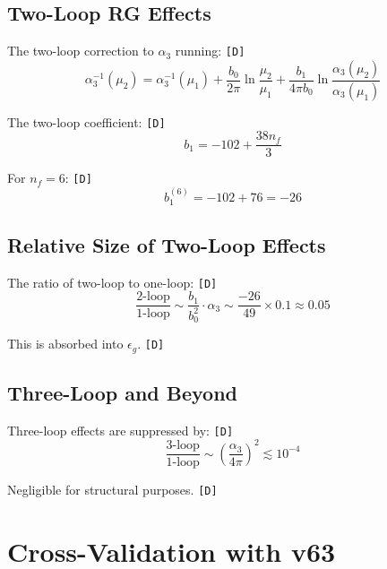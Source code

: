 \documentclass[11pt,a4paper]{article}
\newcommand{\tagD}{\textcolor{green!50!black}{\texttt{[D]}}}
\theoremstyle{definition}
\begin{document}
\subsection{Two-Loop RG Effects}
\label{app:two-loop-effects}

The two-loop correction to $\alpha_3$ running: \tagD{}
\begin{equation}
\label{eq:app-2loop-1}
\alpha_3^{-1}(\mu_2) = \alpha_3^{-1}(\mu_1) + \frac{b_0}{2\pi}\ln\frac{\mu_2}{\mu_1} + \frac{b_1}{4\pi b_0}\ln\frac{\alpha_3(\mu_2)}{\alpha_3(\mu_1)}
\end{equation}

The two-loop coefficient: \tagD{}
\begin{equation}
\label{eq:app-2loop-2}
b_1 = -102 + \frac{38 n_f}{3}
\end{equation}

For $n_f = 6$: \tagD{}
\begin{equation}
\label{eq:app-2loop-3}
b_1^{(6)} = -102 + 76 = -26
\end{equation}

\subsection{Relative Size of Two-Loop Effects}
\label{app:two-loop-size}

The ratio of two-loop to one-loop: \tagD{}
\begin{equation}
\label{eq:app-2loop-4}
\frac{\text{2-loop}}{\text{1-loop}} \sim \frac{b_1}{b_0^2} \cdot \alpha_3 \sim \frac{-26}{49} \times 0.1 \approx 0.05
\end{equation}

This is absorbed into $\epsilon_g$. \tagD{}

\subsection{Three-Loop and Beyond}
\label{app:three-loop}

Three-loop effects are suppressed by: \tagD{}
\begin{equation}
\label{eq:app-3loop-1}
\frac{\text{3-loop}}{\text{1-loop}} \sim \left(\frac{\alpha_3}{4\pi}\right)^2 \lesssim 10^{-4}
\end{equation}

Negligible for structural purposes. \tagD{}

\section{Cross-Validation with v63}
\label{app:cross-validation}
\end{document}
